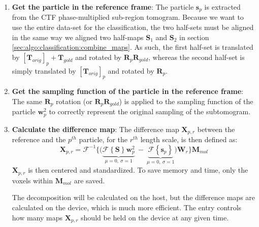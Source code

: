 \begin{enumerate}
    \item \textbf{Get the particle in the reference frame}: The particle $\bm{s}_p$ is extracted from the CTF phase-multiplied sub-region tomogram. Because we want to use the entire data-set for the classification, the two half-sets must be aligned in the same way we aligned two half-maps $\bm{S}_1$ and $\bm{S}_2$ in section \ref{sec:algo:classification:combine_maps}.
    As such, the first half-set is translated by ${[\bm{T}_{orig}]}_p + \bm{T}_{gold}$ and rotated by $\bm{R}_{p} \bm{R}_{gold}$, whereas the second half-set is simply translated by ${[\bm{T}_{orig}]}_p$ and rotated by $\bm{R}_p$.

    \item \textbf{Get the sampling function of the particle in the reference frame}: The same $\bm{R}_p$ rotation (or $\bm{R}_{p} \bm{R}_{gold}$) is applied to the sampling function of the particle $\bm{w}_{p}^2$ to correctly represent the original sampling of the subtomogram.
    
    \item \textbf{Calculate the difference map}: The difference map $\bm{X}_{p,r}$ between the reference and the ${p^{th}}$ particle, for the $r^{th}$ length scale, is then defined as:
    \begin{equation}
        \bm{X}_{p,r} =  \mathcal{F}^{-1} \bigg\{
                                        \Big(
                                            \underbrace{\mathcal{F} \left\{ \bm{S} \right\} \bm{w}^{2}_p}_{\mu=0,\ \sigma=1}\ -\
                                            \underbrace{\mathcal{F} \left\{ \bm{s}_{p} \right\}}_{\mu=0,\ \sigma=1}
                                        \Big) \bm{W}_{r}
                                    \bigg\} \bm{M}_{mol}
    \end{equation}
    $\bm{X}_{p,r}$ is then centered and standardized.
    To save memory and time, only the voxels within $\bm{M}_{mol}$ are saved.
    \begin{note}The decomposition will be calculated on the host, but the difference maps are calculated on the device, which is much more efficient. The  entry controls how many maps $\bm{X}_{p,r}$ should be held on the device at any given time.
    \end{note}
\end{enumerate}

